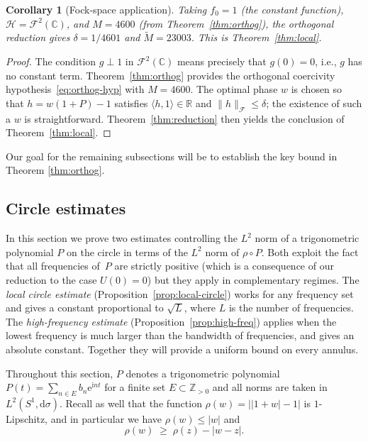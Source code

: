 \documentclass[11pt]{amsart}
\newtheorem{corollary}[theorem]{Corollary}
\theoremstyle{remark}
\begin{document}
\begin{corollary}[Fock-space application]\label{cor:fock-local}
Taking $f_0 = 1$ (the constant function), $\mathcal{H} = \mathcal{F}^2(\mathbb{C})$, and
$M = 4600$ (from Theorem~\ref{thm:orthog}), the orthogonal reduction gives
$\delta = 1/4601$ and $\widetilde{M} = 23003$.
This is Theorem~\ref{thm:local}.
\end{corollary}

\begin{proof}
The condition $g \perp 1$ in $\mathcal{F}^2(\mathbb{C})$ means precisely that
$g(0) = 0$, i.e., $g$ has no constant term.
Theorem~\ref{thm:orthog} provides the orthogonal coercivity
hypothesis~\eqref{eq:orthog-hyp} with $M = 4600$.
The optimal phase $w$ is chosen so that
$h = w(1 + P) - 1$ satisfies $\langle h,1\rangle \in \mathbb{R}$ and
$\lVert h \rVert_{\mathcal{F}} \le \delta$; the existence of such a $w$ is straightforward.
Theorem~\ref{thm:reduction} then yields the conclusion of
Theorem~\ref{thm:local}. 
\end{proof}
Our goal for the remaining subsections will  be to establish the key bound in Theorem  \ref{thm:orthog}.
 \subsection{Circle estimates}\label{subsec:circle}

In this section we prove two estimates controlling the $L^2$ norm of a
trigonometric polynomial $P$ on the circle in terms of the $L^2$ norm of
$\rho \circ P$.  Both exploit the fact that all frequencies of~$P$ are
strictly positive (which is a consequence of our reduction to the case $U(0)=0$) but they apply in
complementary regimes.  The \emph{local circle estimate}
(Proposition~\ref{prop:local-circle}) works for any frequency set and gives a
constant proportional to $\sqrt{L}$, where $L$ is the number of frequencies.
The \emph{high-frequency estimate} (Proposition~\ref{prop:high-freq}) applies
when the lowest frequency is much larger than the bandwidth of frequencies, and gives an
absolute constant. Together they will provide a uniform bound on every
annulus.
 \vspace{0.5em}

Throughout this section, $P$ denotes a trigonometric polynomial
$P(t) = \sum_{n \in E} b_n \mathrm{e}^{\mathrm{i} nt}$ for a finite set $E \subset \mathbb{Z}_{>0}$ 
and all norms are taken in $L^2(S^1, \mathrm{d}\sigma)$. Recall as well that the function $\rho(w) = \bigl\lvert \lvert 1+w \rvert - 1 \bigr\rvert$
 is $1$-Lipschitz, and in particular we have $\rho(w) \le \lvert w \rvert$ and
\begin{equation}\label{eq:rho-lip}
\rho(w) \;\ge\; \rho(z) - \lvert w - z \rvert.
\end{equation}
\end{document}
